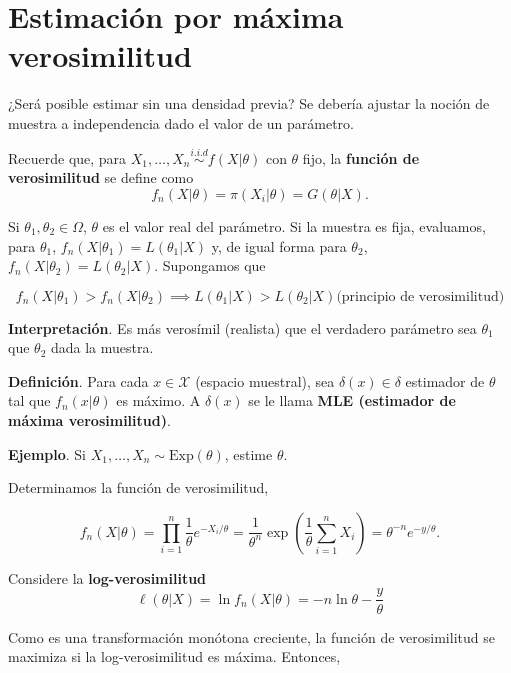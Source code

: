 \documentclass[
  12pt,
]{book}
\begin{document}
\hypertarget{estimaciuxf3n-por-muxe1xima-verosimilitud}{%
\chapter{Estimación por máxima verosimilitud}\label{estimaciuxf3n-por-muxe1xima-verosimilitud}}

¿Será posible estimar sin una densidad previa? Se debería ajustar la noción de
muestra a independencia dado el valor de un parámetro.

Recuerde que, para \(X_1,\dots, X_n \stackrel{i.i.d}{\sim} f(X|\theta)\) con \(\theta\)
fijo, la \textbf{función de verosimilitud} se define como \[ f_n(X|\theta) =
\pi(X_i|\theta) = G(\theta|X).\]

Si \(\theta_1,\theta_2\in \Omega\), \(\theta\) es el valor real del parámetro. Si la muestra es
fija, evaluamos, para \(\theta_1\), \(f_n(X|\theta_1) = L(\theta_1|X)\) y, de igual forma para
\(\theta_2\), \(f_n(X|\theta_2) = L(\theta_2|X)\). Supongamos que

\begin{equation*}
f_n(X|\theta_1) >f_n(X|\theta_2) \implies L(\theta_1|X)>L(\theta_2|X) \text{
(principio de verosimilitud)} 
\end{equation*}

\textbf{Interpretación}. Es más verosímil (realista) que el verdadero parámetro sea
\(\theta_1\) que \(\theta_2\) dada la muestra.

\textbf{Definición}. Para cada \(x\in \mathcal{X}\) (espacio muestral), sea
\(\delta(x) \in \delta\) estimador de \(\theta\) tal que \(f_n(x|\theta)\) es máximo. A
\(\delta(x)\) se le llama \textbf{MLE (estimador de máxima verosimilitud)}.

\textbf{Ejemplo}. Si \(X_1,\dots, X_n \sim \text{Exp}(\theta)\), estime \(\theta\).

Determinamos la función de verosimilitud,

\begin{equation*} 
f_n(X|\theta) =
\prod_{i=1}^n \dfrac{1}\theta e^{-X_i/\theta} = \dfrac1{\theta^n}
\exp\left(\dfrac{1}\theta \sum_{i=1}^nX_i\right) = \theta^{-n}e^{-y/\theta}.
\end{equation*}

Considere la \textbf{log-verosimilitud}
\begin{equation*}
\ell(\theta|X) = \ln f_n(X|\theta) = -n\ln \theta - \dfrac{y}{\theta}
\end{equation*}

Como es una transformación monótona creciente, la función de verosimilitud se
maximiza si la log-verosimilitud es máxima. Entonces,
\end{document}
